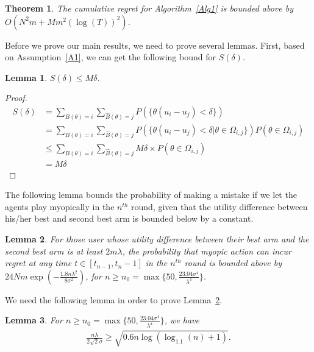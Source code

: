 \documentclass{article}
\newtheorem{theorem}{Theorem}
\newtheorem{lemma}{Lemma}
\begin{document}
\begin{theorem}
The cumulative regret for Algorithm~\ref{Alg1} is bounded above by $O(N^2 m + M m^2(\log(T))^2)$.
\label{rst:regret}
\end{theorem}

Before we prove our main results, we need to prove several lemmas. First, based on Assumption~\ref{A1}, we can get the following bound for $S(\delta)$.

\begin{lemma}
$S(\delta)\leq M\delta$.
\label{lemma:sdelta}
\end{lemma}

\begin{proof}
\begin{align}
S(\delta)&=\sum_{B(\theta)=i}\sum_{\hat{B}(\theta)=j}P(\{\theta(u_{i}-u_{j})<\delta\}) \nonumber \\
&=\sum_{B(\theta)=i}\sum_{\hat{B}(\theta)=j}P(\{\theta(u_{i}-u_{j})<\delta|\theta\in \Omega_{i,j}\})P(\theta\in \Omega_{i,j}) \nonumber \\
&\leq \sum_{B(\theta)=i}\sum_{\hat{B}(\theta)=j}M\delta \times P(\theta\in \Omega_{i,j}) \nonumber \\
&=M\delta \nonumber 
\end{align}
\end{proof}

The following lemma bounds the probability of making a mistake if we let the agents play myopically in the $n^{th}$ round, given that the utility difference between his/her best and second best arm is bounded below by a constant.

\begin{lemma}
For those user whose utility difference between their best arm and the second best arm is at least $2m\lambda$, the probability that myopic action can incur regret at any time $t\in [t_{n-1},t_{n}-1]$ in the $n^{th}$ round is bounded above by $24Nm\exp\left(-\frac{1.8n\lambda^2}{8\sigma^2}\right)$, for $n\geq n_{0}=\max\{50, \frac{23.04\sigma^4}{\lambda^4}\}$.
\label{round:prob}
\end{lemma}


We need the following lemma in order to prove Lemma~\ref{round:prob}.

\begin{lemma}
For $n\geq n_{0}=\max\{50, \frac{23.04\sigma^4}{\lambda^4}\}$, we have
\begin{align}
\frac{n\lambda}{2\sqrt{2}\sigma}\geq \sqrt{0.6n\log(\log_{1.1}(n)+1)}. \nonumber
\end{align}
\label{n0-inequality}
\end{lemma}
\end{document}
